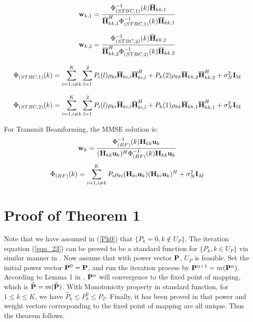 \documentclass[draftcls,onecolumn,peerview,12pt]{IEEEtran}
\begin{document}
\begin{equation}
{\rm{\bf w}}_{k,1}=\frac{\Phi_{(STBC,1)}^{-1}(k)\overline{\rm{\bf
H}}_{kk,1}}{\overline{\rm{\bf
H}}_{kk,1}^H\Phi_{(STBC,1)}^{-1}(k)\overline{\rm{\bf H}}_{kk,1}}
\end{equation}

\begin{equation}
{\rm{\bf w}}_{k,2}=\frac{\Phi_{(STBC,2)}^{-1}(k)\overline{\rm{\bf
H}}_{kk,2}}{\overline{\rm{\bf
H}}_{kk,2}^H\Phi_{(STBC,2)}^{-1}(k)\overline{\rm{\bf H}}_{kk,2}}
\end{equation}

\begin{equation}
\Phi_{(STBC,1)}(k)=\sum\limits_{i=1, i\neq
k}^{K}\sum\limits_{l=1}^{2}P_i(l)\rho_{ki}\overline{\rm{\bf
H}}_{ki,l}\overline{\rm{\bf
H}}_{ki,l}^H+P_k(2)\rho_{kk}\overline{\rm{\bf
H}}_{kk,2}\overline{\rm{\bf H}}_{kk,2}^H+\sigma_N^2\rm{\bf I}_M
\end{equation}

\begin{equation}
\Phi_{(STBC,2)}(k)=\sum\limits_{i=1, i\neq
k}^{K}\sum\limits_{l=1}^{2}P_i(l)\rho_{ki}\overline{\rm{\bf
H}}_{ki,l}\overline{\rm{\bf
H}}_{ki,l}^H+P_k(1)\rho_{kk}\overline{\rm{\bf
H}}_{kk,1}\overline{\rm{\bf H}}_{kk,1}^H+\sigma_N^2\rm{\bf I}_M
\end{equation}

For Transmit Beamforming, the MMSE solution is:
\begin{equation}
{\rm{\bf w}}_{k}=\frac{\Phi _{(BF)}^{-1}(k) {\rm {\bf H}}_{kk} {\rm
{\bf u}}_k}{({\rm {\bf H}}_{kk} {\rm {\bf u}}_k )^H\Phi
_{(BF)}^{-1}(k) {\rm {\bf H}}_{kk} {\rm {\bf u}}_k}
\end{equation}
\begin{equation}
\Phi_{(BF)}(k)=\sum\limits_{i=1,i\ne k}^K {P_i \rho_{ki} ({\rm {\bf
H}}_{ki} {\rm {\bf u}}_k )}({\rm {\bf H}}_{ki} {\rm {\bf u}}_k )^H
+\sigma_N^2 {\rm {\bf I}}_M
\end{equation}



\section{Proof of Theorem 1}
Note that we have assumed in (\ref{Pk0}) that $\{P_k=0, k\notin
U_P\}$. The iteration equation (\ref{eqn_23}) can be proved to be a
standard function \cite{23_FrameworkUplink1995} for $\{P_k, k\in
U_P\}$ via similar manner in \cite{13_JointOptimal1998}. Now assume
that with power vector ${\rm{\bf P}}$, $U_P$ is feasible. Set the
initial power vector ${\rm{\bf P}}^0={\rm{\bf P}}$, and run the
iteration process by ${\rm{\bf P}}^{n+1}=m({\rm{\bf P}}^n)$.
According to Lemma 1 in \cite{23_FrameworkUplink1995}, ${\rm{\bf
P}}^n$ will convergence to the fixed point of mapping, which is
$\widehat{{\rm{\bf P}}}= m(\widehat{{\rm{\bf P}}})$. With
Monotonicity property in standard function, for $1 \leq k \leq K$,
we have $\widehat{P}_k\leq P_k^0 \leq P_T$. Finally, it has been
proved in \cite{13_JointOptimal1998} that power and weight vectors
corresponding to the fixed point of mapping are all unique. Thus the
theorem follows.
\end{document}

